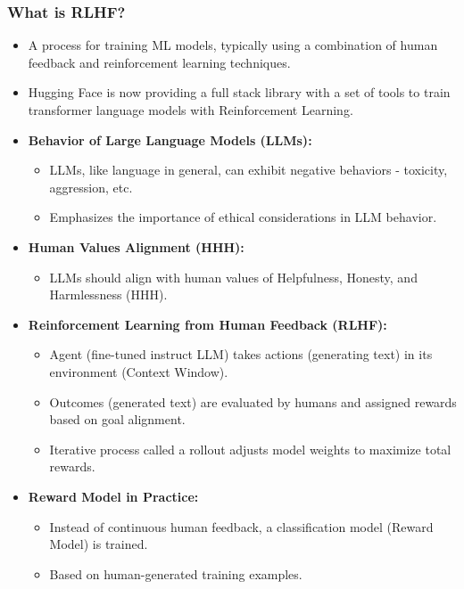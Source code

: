 \begin{frame}[fragile]\frametitle{What is RLHF?}

\begin{itemize}
\item  A process for training ML models, typically using a combination of human feedback and reinforcement learning techniques.
\item Hugging Face is now providing a full stack library with a set of tools to train transformer language models with Reinforcement Learning. 
  \item \textbf{Behavior of Large Language Models (LLMs):}
    \begin{itemize}
      \item LLMs, like language in general, can exhibit negative behaviors - toxicity, aggression, etc.
      \item Emphasizes the importance of ethical considerations in LLM behavior.
    \end{itemize}

  \item \textbf{Human Values Alignment (HHH):}
    \begin{itemize}
      \item LLMs should align with human values of Helpfulness, Honesty, and Harmlessness (HHH).
    \end{itemize}

  \item \textbf{Reinforcement Learning from Human Feedback (RLHF):}
    \begin{itemize}
      \item Agent (fine-tuned instruct LLM) takes actions (generating text) in its environment (Context Window).
      \item Outcomes (generated text) are evaluated by humans and assigned rewards based on goal alignment.
      \item Iterative process called a rollout adjusts model weights to maximize total rewards.
    \end{itemize}

  \item \textbf{Reward Model in Practice:}
    \begin{itemize}
      \item Instead of continuous human feedback, a classification model (Reward Model) is trained.
      \item Based on human-generated training examples.
    \end{itemize}
\end{itemize}

\end{frame}

